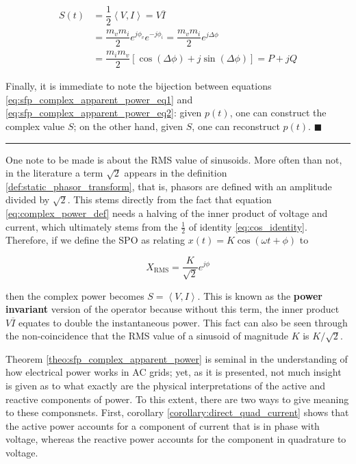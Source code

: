 \begin{align}
S(t)
	&= \dfrac{1}{2}\left<V,I\right> = V\overline{I} \nonumber\\[3mm]
	&= \dfrac{m_vm_i}{2} e^{j\phi_v} e^{-j\phi_i} = \dfrac{m_v m_i}{2} e^{j\Delta\phi} \nonumber\\[3mm]
	&= \dfrac{m_i m_v}{2} \left[\cos\left(\Delta\phi\right) + j\sin\left(\Delta\phi\right) \right] = P + jQ \label{eq:sfp_complex_apparent_power_eq3}
\end{align}

	Finally, it is immediate to note the bijection between equations \eqref{eq:sfp_complex_apparent_power_eq1} and \eqref{eq:sfp_complex_apparent_power_eq2}: given $p(t)$, one can construct the complex value $S$; on the other hand, given $S$, one can reconstruct $p(t)$.  \hfill$\blacksquare$

\vspace{5mm}
\hrule
\vspace{5mm}

	One note to be made is about the RMS value of sinusoids. More often than not, in the literature a term $\sqrt{2}$ appears in the definition \ref{def:static_phasor_transform}, that is, phasors are defined with an amplitude divided by $\sqrt{2}$. This stems directly from the fact that equation \eqref{eq:complex_power_def} needs a halving of the inner product of voltage and current, which ultimately stems from the $\frac{1}{2}$ of identity \eqref{eq:cos_identity}. Therefore, if we define the SPO as relating $x(t) = K\cos\left(\omega t + \phi\right)$ to 

\begin{equation} X_{\text{RMS}} = \dfrac{K}{\sqrt{2}}e^{j\phi} \end{equation}

	\noindent then the complex power becomes $S = \left\langle V, I\right\rangle$. This is known as the \textbf{power invariant} version of the operator because without this term, the inner product $V\overline{I}$ equates to double the instantaneous power. This fact can also be seen through the non-coincidence that the RMS value of a sinusoid of magnitude $K$ is $K/\sqrt{2}$.

	Theorem \ref{theo:sfp_complex_apparent_power} is seminal in the understanding of how electrical power works in AC grids; yet, as it is presented, not much insight is given as to what exactly are the physical interpretations of the active and reactive components of power. To this extent, there are two ways to give meaning to these componsnets. First, corollary \ref{corollary:direct_quad_current} shows that the active power accounts for a component of current that is in phase with voltage, whereas the reactive power accounts for the component in quadrature to voltage.

